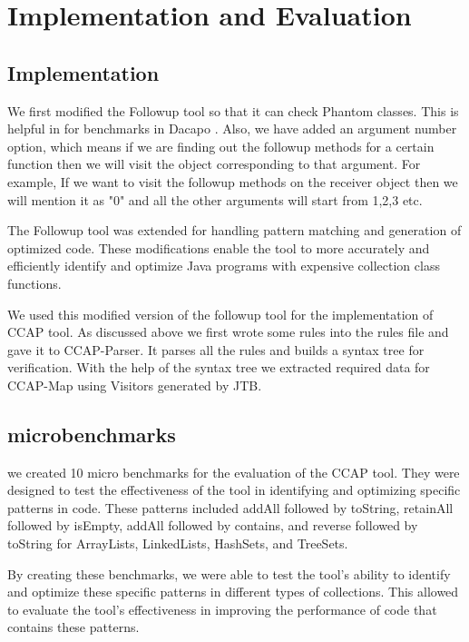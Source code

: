 \chapter{Implementation and Evaluation}

\section{Implementation}

We first modified the Followup tool so that it can check Phantom classes. This is helpful in for benchmarks in Dacapo \cite{TamiFlex}. Also, we have added an argument number option, which means if we are finding out the followup methods for a certain function then we will visit the object corresponding to that argument. For example, If we want to visit the followup methods on the receiver object then we will mention it as "0" and all the other arguments will start from 1,2,3 etc.

The Followup tool was extended for handling pattern matching and generation of optimized code. These modifications enable the tool to more accurately and efficiently identify and optimize Java programs with expensive collection class functions.

We used this modified version of the followup tool for the implementation of CCAP tool. As discussed above we first wrote some rules into the rules file and gave it to CCAP-Parser. It parses all the rules and builds a syntax tree for verification. With the help of the syntax tree we extracted required data for CCAP-Map using Visitors generated by JTB.

\section{microbenchmarks}

we created 10 micro benchmarks for the evaluation of the CCAP tool. They were designed to test the effectiveness of the tool in identifying and optimizing specific patterns in code. These patterns included addAll followed by toString, retainAll followed by isEmpty, addAll followed by contains, and reverse followed by toString for ArrayLists, LinkedLists, HashSets, and TreeSets.

By creating these benchmarks, we were able to test the tool's ability to identify and optimize these specific patterns in different types of collections. This allowed to evaluate the tool's effectiveness in improving the performance of code that contains these patterns.

